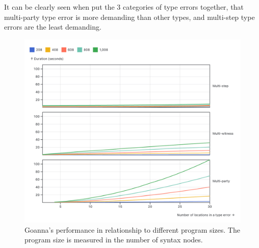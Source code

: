 \documentclass[pdflatex,sn-mathphys-num]{sn-jnl}%
\begin{document}
It can be clearly seen when put the 3 categories of type errors together, that multi-party type error is more demanding than other types, and multi-step type errors are the least demanding. 
     \begin{figure}[ht]
        \centering
        \includegraphics[width=\linewidth]{images/compare-time.png}
        \caption{Goanna's performance in relationship to different program sizes. The program size is measured in the number of syntax nodes.}
        \label{fig:compare-time}
    \end{figure}


    
\end{document}
